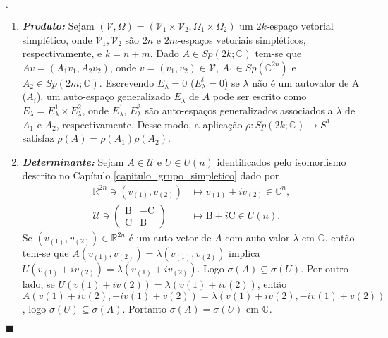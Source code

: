 \documentclass[12pt]{book}
\newenvironment{prova}[1]{$\square$ #1}{\hfill$\blacksquare$}
\newcommand{\circulo}{S^{1}}
\newcommand{\complexificado}[1]{\mathcal{#1}}
\newcommand{\complexo}[1]{\mathbb{C}^{#1}}
\newcommand{\espectrooperador}[1]{\sigma(#1)}
\newcommand{\gruposimpletico}[1]{Sp(#1)}
\newcommand{\gruposimpleticocomplexo}[1]{Sp(#1; \complexo{})}
\newcommand{\matrizunitaria}[1]{U(#1)}
\newcommand{\real}[1]{\mathbb{R}^{#1}}
\begin{document}
\begin{prova}
\begin{enumerate}
			\item \textbf{\textit{Produto:}} Sejam $(\complexificado{V}, \Omega) = (\complexificado{V}_{1}\times \complexificado{V}_{2}, \Omega_{1}\times \Omega_{2})$ um $2k$-espaço vetorial simplético, onde $\complexificado{V}_{1}, \complexificado{V}_{2}$ são $2n$ e $2m$-espaços vetoriais simpléticos, respectivamente, e $k=n+m$. Dado $A \in \gruposimpleticocomplexo{2k}$ tem-se que $Av = (A_{1}v_{1}, A_{2}v_{2})$, onde $v=(v_{1}, v_{2}) \in \complexificado{V}$, $A_{1}\in \gruposimpletico{\complexo{2n}}$ e $A_{2}\in \gruposimpleticocomplexo{2m}$. Escrevendo $E_\lambda=0$ ($E_\lambda^i=0$) se $\lambda$ não é um autovalor de A ($A_i$), um auto-espaço generalizado $E_{\lambda}$ de $A$ pode ser escrito como $E_{\lambda} = E_{\lambda}^{1}\times E_{\lambda}^{2}$, onde $E_{\lambda}^{1}$, $E_{\lambda}^{2}$ são auto-espaços generalizados associados a $\lambda$ de $A_{1}$ e $A_{2}$, respectivamente. Desse modo, a aplicação $\rho: \gruposimpleticocomplexo{2k} \to \circulo$ satisfaz $\rho(A) = \rho(A_{1})\rho(A_{2})$.
			
			\item \textbf{\textit{Determinante:}} Sejam $A \in \mathcal{U}$ e $U \in \matrizunitaria{n}$ identificados pelo isomorfismo descrito no Capítulo \ref{capitulo_grupo_simpletico} dado por
			$$
			\begin{aligned}
			\real{2n} \ni (v_{(1)},v_{(2)}) &\mapsto v_{(1)}+iv_{(2)} \in \complexo{n},
			\\
			\mathcal{U} \ni 
			\left(
			\begin{array}{cc}
			\text{B} & -\text{C}
			\\
			\text{C} & \text{B}
			\end{array}
			\right) 
			& \mapsto \text{B}+i\text{C} \in \matrizunitaria{n}.
			\end{aligned}
			$$
			Se $(v_{(1)},v_{(2)}) \in \real{2n}$ é um auto-vetor de $A$ com auto-valor $\lambda$ em $\complexo{}$, então tem-se que $A(v_{(1)},v_{(2)})=\lambda (v_{(1)},v_{(2)}) $ implica $U(v_{(1)}+iv_{(2)}) = \lambda(v_{(1)}+iv_{(2)})$. Logo $\espectrooperador{A} \subseteq \espectrooperador{U}$. Por outro lado, se $U(v(1)+iv(2))=\lambda(v(1)+iv(2))$, então $A(v(1)+iv(2), -iv(1)+v(2))=\lambda (v(1)+iv(2), -iv(1)+v(2))$, logo $\espectrooperador{U} \subseteq\espectrooperador{A}$. Portanto $\espectrooperador{A} =\espectrooperador{U}$ em $\complexo{}$.
			

\end{enumerate}
\end{prova}
\end{document}
